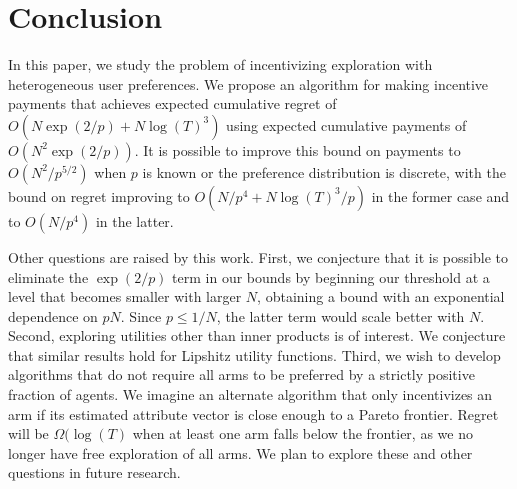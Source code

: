 \section{Conclusion}
In this paper, we study the problem of incentivizing exploration with heterogeneous user preferences.  We propose an algorithm for making incentive payments that achieves  expected cumulative regret of $O(N\exp(2/p) + N \log(T)^3)$ using expected cumulative payments of $O(N^2 \exp(2/p))$.  It is possible to improve this bound on payments to $O(N^2 / p^{5/2})$ when $p$ is known or the preference distribution is discrete, with the bound on regret improving to $O(N/p^4 + N \log(T)^3 / p)$ in the former case and to $O(N/p^4)$ in the latter.

Other questions are raised by this work.  First, we conjecture that it is possible to eliminate the $\exp(2/p)$ term in our bounds by beginning our threshold at a level that becomes smaller with larger $N$, obtaining a bound with an exponential dependence on $pN$.  Since $p \le 1/N$, the latter term would scale better with $N$.
Second, exploring utilities other than inner products is of interest.  We conjecture that similar results hold for Lipshitz utility functions.
Third, we wish to develop algorithms that do not require all arms to be preferred by a strictly positive fraction of agents.  We imagine an alternate algorithm that only incentivizes an arm if its estimated attribute vector is close enough to a Pareto frontier.  
Regret will be $\Omega(\log(T)$ when at least one arm falls below the frontier, as we no longer have free exploration of all arms.  
We plan to explore these and other questions in future research.
